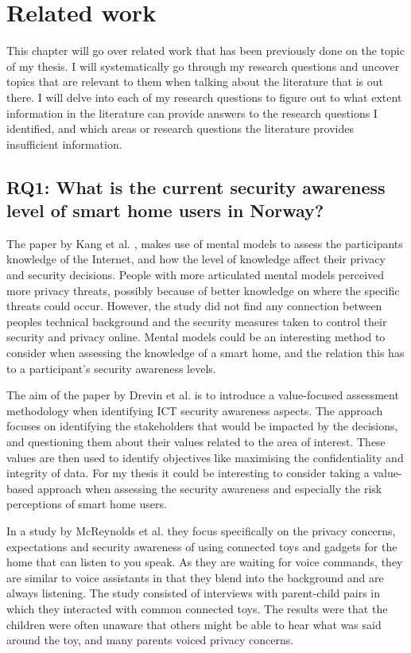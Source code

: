 \chapter{Related work}
This chapter will go over related work that has been previously done on the topic of my thesis. I will systematically go through my research questions and uncover topics that are relevant to them when talking about the literature that is out there. I will delve into each of my research questions to figure out to what extent information in the literature can provide answers to the research questions I identified, and which areas or research questions the literature provides insufficient information.

\section{RQ1: What is the current security awareness level of smart home users in Norway?}
The paper by Kang et al. \cite{Kang2015}, makes use of mental models to assess the participants knowledge of the Internet, and how the level of knowledge affect their privacy and security decisions. People with more articulated mental models perceived more privacy threats, possibly because of better knowledge on where the specific threats could occur. However, the study did not find any connection between peoples technical background and the security measures taken to control their security and privacy online. Mental models could be an interesting method to consider when assessing the knowledge of a smart home, and the relation this has to a participant's security awareness levels. 

The aim of the paper by Drevin et al. \cite{Drevin2006} is to introduce a value-focused assessment methodology when identifying ICT security awareness aspects. The approach focuses on identifying the stakeholders that would be impacted by the decisions, and questioning them about their values related to the area of interest. These values are then used to identify objectives like maximising the confidentiality and integrity of data. For my thesis it could be interesting to consider taking a value-based approach when assessing the security awareness and especially the risk perceptions of smart home users. 

In a study by McReynolds et al. \cite{McReynolds:2017:TLS:3025453.3025735} they focus specifically on the privacy concerns, expectations and security awareness of using connected toys and gadgets for the home that can listen to you speak. As they are waiting for voice commands, they are similar to voice assistants in that they blend into the background and are always listening. The study consisted of interviews with parent-child pairs in which they interacted with common connected toys. The results were that the children were often unaware that others might be able to hear what was said around the toy, and many parents voiced privacy concerns. 

